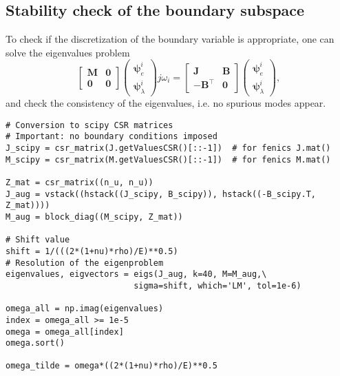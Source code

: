 \subsection*{Stability check of the boundary subspace}
To check if the discretization of the boundary variable is appropriate, one can solve the eigenvalues problem
\begin{equation*}
	\begin{bmatrix}
	\mathbf{M} & \mathbf{0} \\
	\mathbf{0} & \mathbf{0}
	\end{bmatrix}
	\begin{pmatrix}
	\bm{\psi}_e^i \\
	\bm{\psi}_\lambda^i
	\end{pmatrix} j \omega_i  = 
	\begin{bmatrix}
	\mathbf{J} & \mathbf{B} \\
	-\mathbf{B}^\top & \mathbf{0}
	\end{bmatrix}
	\begin{pmatrix}
	\bm{\psi}_e^i \\
	\bm{\psi}_\lambda^i
	\end{pmatrix},
\end{equation*}
and check the consistency of the eigenvalues, i.e. no spurious modes appear.
\begin{tcolorbox}[title = Eigenvalues computation using Lagrange multipliers (\textsc{Scipy}), coltitle=black, breakable, size=fbox, boxrule=1pt, pad at break*=1mm, colframe=green, enlarge top by=0.25em, enlarge bottom by=0.5em]
\begin{Verbatim}[tabsize=4]
# Conversion to scipy CSR matrices 
# Important: no boundary conditions imposed
J_scipy = csr_matrix(J.getValuesCSR()[::-1])  # for fenics J.mat() 
M_scipy = csr_matrix(M.getValuesCSR()[::-1])  # for fenics M.mat() 

Z_mat = csr_matrix((n_u, n_u))
J_aug = vstack((hstack((J_scipy, B_scipy)), hstack((-B_scipy.T, Z_mat))))
M_aug = block_diag((M_scipy, Z_mat))

# Shift value
shift = 1/(((2*(1+nu)*rho)/E)**0.5)
# Resolution of the eigenproblem
eigenvalues, eigvectors = eigs(J_aug, k=40, M=M_aug,\
	 					  sigma=shift, which='LM', tol=1e-6)

omega_all = np.imag(eigenvalues)
index = omega_all >= 1e-5
omega = omega_all[index]
omega.sort()

omega_tilde = omega*((2*(1+nu)*rho)/E)**0.5
\end{Verbatim}
\end{tcolorbox}

